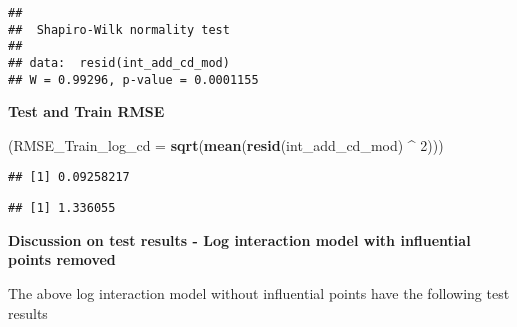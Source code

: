 \documentclass[]{article}
\newenvironment{Shaded}{\begin{snugshade}}{\end{snugshade}}
\newcommand{\KeywordTok}[1]{\textcolor[rgb]{0.13,0.29,0.53}{\textbf{#1}}}
\newcommand{\DataTypeTok}[1]{\textcolor[rgb]{0.13,0.29,0.53}{#1}}
\newcommand{\DecValTok}[1]{\textcolor[rgb]{0.00,0.00,0.81}{#1}}
\newcommand{\StringTok}[1]{\textcolor[rgb]{0.31,0.60,0.02}{#1}}
\newcommand{\OperatorTok}[1]{\textcolor[rgb]{0.81,0.36,0.00}{\textbf{#1}}}
\newcommand{\NormalTok}[1]{#1}
\begin{document}
\begin{verbatim}
## 
##  Shapiro-Wilk normality test
## 
## data:  resid(int_add_cd_mod)
## W = 0.99296, p-value = 0.0001155
\end{verbatim}

\textbf{Test and Train RMSE}

\begin{Shaded}
\begin{Highlighting}[]
\NormalTok{(}\DataTypeTok{RMSE_Train_log_cd =} \KeywordTok{sqrt}\NormalTok{(}\KeywordTok{mean}\NormalTok{(}\KeywordTok{resid}\NormalTok{(int_add_cd_mod) }\OperatorTok{^}\StringTok{ }\DecValTok{2}\NormalTok{)))}
\end{Highlighting}
\end{Shaded}

\begin{verbatim}
## [1] 0.09258217
\end{verbatim}

\begin{Shaded}
\end{Shaded}

\begin{verbatim}
## [1] 1.336055
\end{verbatim}

\textbf{Discussion on test results - Log interaction model with
influential points removed}

The above log interaction model without influential points have the
following test results
\end{document}
